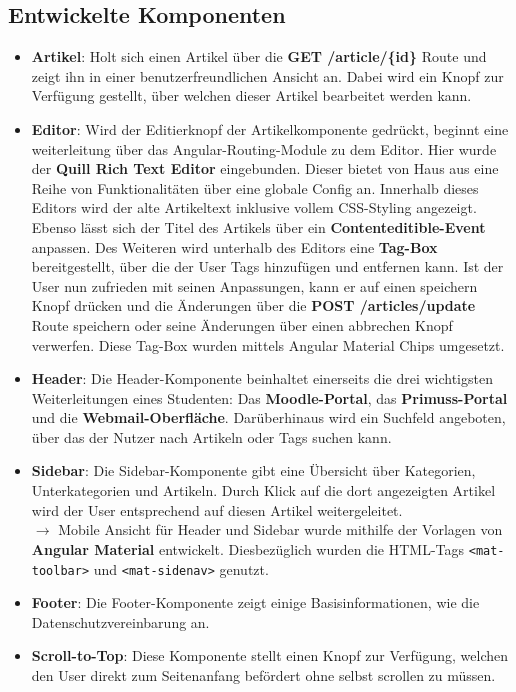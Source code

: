\subsection{Entwickelte Komponenten}
\begin{itemize}
\item \textbf{Artikel}: Holt sich einen Artikel über die \textbf{GET /article/\{id\}} Route und zeigt ihn in einer benutzerfreundlichen Ansicht an. Dabei wird ein Knopf zur Verfügung gestellt, über welchen dieser Artikel bearbeitet werden kann.
\item \textbf{Editor}: Wird der Editierknopf der Artikelkomponente gedrückt, beginnt eine weiterleitung über das Angular-Routing-Module zu dem Editor. Hier wurde der \textbf{Quill Rich Text Editor} eingebunden. 
Dieser bietet von Haus aus eine Reihe von Funktionalitäten über eine globale Config an.
Innerhalb dieses Editors wird der alte Artikeltext inklusive vollem CSS-Styling angezeigt. 
Ebenso lässt sich der Titel des Artikels über ein \textbf{Contenteditible-Event} anpassen. 
Des Weiteren wird unterhalb des Editors eine \textbf{Tag-Box} bereitgestellt, über die der User Tags hinzufügen und entfernen kann. Ist der User nun zufrieden mit seinen Anpassungen, kann er auf einen speichern Knopf drücken und die Änderungen über die \textbf{POST /articles/update} Route speichern oder seine Änderungen über einen abbrechen Knopf verwerfen. 
Diese Tag-Box wurden mittels Angular Material Chips umgesetzt.
\item \textbf{Header}: Die Header-Komponente beinhaltet einerseits die drei wichtigsten Weiterleitungen eines Studenten: Das \textbf{Moodle-Portal}, das \textbf{Primuss-Portal} und die \textbf{Webmail-Oberfläche}. Darüberhinaus wird ein Suchfeld angeboten, über das der Nutzer nach Artikeln oder Tags suchen kann.
\item \textbf{Sidebar}: Die Sidebar-Komponente gibt eine Übersicht über Kategorien, Unterkategorien und Artikeln. Durch Klick auf die dort angezeigten Artikel wird der User entsprechend auf diesen Artikel weitergeleitet. \\
$\rightarrow$ Mobile Ansicht für Header und Sidebar wurde mithilfe der Vorlagen von \textbf{Angular Material} entwickelt. Diesbezüglich wurden die HTML-Tags \texttt{<mat-toolbar>} und \texttt{<mat-sidenav>} genutzt.
\item \textbf{Footer}: Die Footer-Komponente zeigt einige Basisinformationen, wie die Datenschutzvereinbarung an. 
\item \textbf{Scroll-to-Top}: Diese Komponente stellt einen Knopf zur Verfügung, welchen den User direkt zum Seitenanfang befördert ohne selbst scrollen zu müssen. 
\end{itemize}

